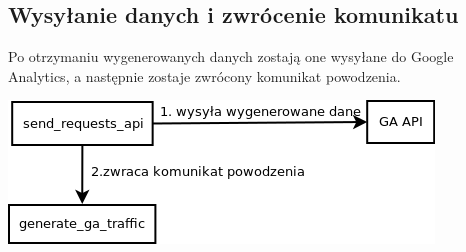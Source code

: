 \documentclass{article}
\begin{document}
\subsection{Wysyłanie danych i zwrócenie komunikatu}
Po otrzymaniu wygenerowanych danych zostają one wysyłane do Google Analytics, a następnie zostaje zwrócony komunikat powodzenia.

\begin{center}\includegraphics[scale=0.5]{send_data}\end{center}
\end{document}
